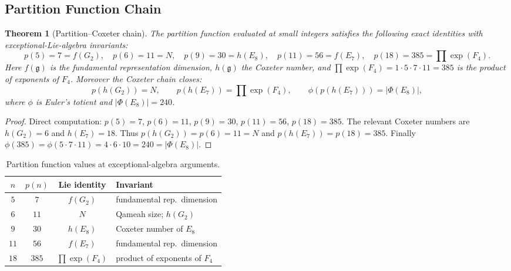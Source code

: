 \documentclass[11pt]{amsart}
\theoremstyle{plain}
\newtheorem{theorem}{Theorem}[section]
\theoremstyle{definition}
\theoremstyle{remark}
\renewcommand{\Phi}{\varPhi}
\begin{document}
\subsection{Partition Function Chain}\label{subsec:partition-chain}

\begin{theorem}[Partition--Coxeter chain]\label{thm:partition-coxeter}
The partition function evaluated at small integers satisfies the following
exact identities with exceptional-Lie-algebra invariants:
\[
  p(5)=7=f(G_2),\quad
  p(6)=11=N,\quad
  p(9)=30=h(E_8),\quad
  p(11)=56=f(E_7),\quad
  p(18)=385=\prod\!\operatorname{exp}(F_4).
\]
Here $f(\mathfrak{g})$ is the fundamental representation dimension,
$h(\mathfrak{g})$ the Coxeter number, and
$\prod\!\operatorname{exp}(F_4) = 1\cdot5\cdot7\cdot11 = 385$
is the product of exponents of $F_4$.
Moreover the Coxeter chain closes:
\begin{equation}\label{eq:coxeter-chain}
  p\!\left(h(G_2)\right) = N,\qquad
  p\!\left(h(E_7)\right) = \prod\!\operatorname{exp}(F_4),\qquad
  \phi\!\left(p\!\left(h(E_7)\right)\right) = |\Phi(E_8)|,
\end{equation}
where $\phi$ is Euler's totient and $|\Phi(E_8)|=240$.
\end{theorem}

\begin{proof}
Direct computation: $p(5)=7$, $p(6)=11$, $p(9)=30$, $p(11)=56$,
$p(18)=385$.  The relevant Coxeter numbers are $h(G_2)=6$ and
$h(E_7)=18$.  Thus $p(h(G_2))=p(6)=11=N$ and
$p(h(E_7))=p(18)=385$.  Finally
$\phi(385)=\phi(5\cdot7\cdot11)=4\cdot6\cdot10=240=|\Phi(E_8)|$.
\end{proof}

\begin{table}[h]
\centering
\caption{Partition function values at exceptional-algebra arguments.}
\label{tab:partition-coxeter}
\begin{tabular}{cccl}
\hline
$n$ & $p(n)$ & Lie identity & Invariant \\
\hline
$5$  & $7$   & $f(G_2)$                       & fundamental rep.\ dimension \\
$6$  & $11$  & $N$                            & Qameah size; $h(G_2)$ \\
$9$  & $30$  & $h(E_8)$                       & Coxeter number of $E_8$ \\
$11$ & $56$  & $f(E_7)$                       & fundamental rep.\ dimension \\
$18$ & $385$ & $\prod\!\operatorname{exp}(F_4)$ & product of exponents of $F_4$ \\
\hline
\end{tabular}
\end{table}
\end{document}
